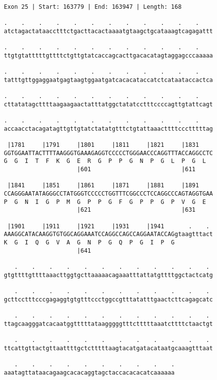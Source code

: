 \documentclass{article}
\begin{document}
\newpage
\begin{Verbatim}[fontfamily=courier]
Exon 25 | Start: 163779 | End: 163947 | Length: 168

.    .    .    .    .    .    .    .    .    .    .    .    
atctagactataacctttctgacttacactaaaatgtaagctgcataaagtcagagattt

.    .    .    .    .    .    .    .    .    .    .    .    
ttgtgtatttttgttttctgttgtatcaccagcacttgacacatagtaggagcccaaaaa

.    .    .    .    .    .    .    .    .    .    .    .    
tatttgttggaggaatgagtaagtggaatgatcacacataccatctcataataccactca

.    .    .    .    .    .    .    .    .    .    .    .    
cttatatagcttttaagaagaactatttatggctatatcctttccccagttgtattcagt

.    .    .    .    .    .    .    .    .    .    .    .    
accaacctacagatagttgttgtatctatatgtttctgtattaaacttttccctttttag

 |1781     |1791     |1801     |1811     |1821     |1831    
GGTGGAATTACTTTTAAGGGTGAAAGAGGTCCCCCTGGGAACCCAGGTTTACCAGGCCTC
G  G  I  T  F  K  G  E  R  G  P  P  G  N  P  G  L  P  G  L  
                     |601                          |611     

 |1841     |1851     |1861     |1871     |1881     |1891    
CCAGGGAATATAGGGCCTATGGGTCCCCCTGGTTTCGGCCCTCCAGGCCCAGTAGGTGAA
P  G  N  I  G  P  M  G  P  P  G  F  G  P  P  G  P  V  G  E  
                     |621                          |631     

 |1901     |1911     |1921     |1931     |1941       .    . 
AAAGGCATACAAGGTGTGGCAGGAAATCCAGGCCAGCCAGGAATACCAGgtaagtttact
K  G  I  Q  G  V  A  G  N  P  G  Q  P  G  I  P  G           
                     |641                                   

   .    .    .    .    .    .    .    .    .    .    .    . 
gtgttttgttttaaacttggtgcttaaaaacagaaatttattatgttttggctactcatg

   .    .    .    .    .    .    .    .    .    .    .    . 
gcttcctttcccgagaggtgtgtttccctggccgtttatatttgaactcttcagagcatc

   .    .    .    .    .    .    .    .    .    .    .    . 
ttagcaagggatcacaatggtttttataagggggtttctttttaaatcttttctaactgt

   .    .    .    .    .    .    .    .    .    .    .    . 
ttcattgttactgttaattttgctctttttaagtacatgatacataatgcaaagtttaat

   .    .    .    .    .    .    .    .    .    .
aaatagttataacagaagcacacaggtagctaccacacacatcaaaaaa
\end{Verbatim}
\end{document}
